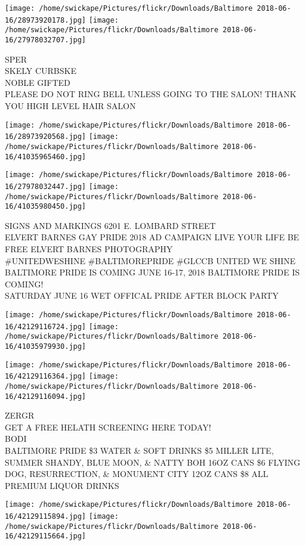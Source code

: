 \documentclass[10pt,letterpaper]{article}
\begin{document}
\texttt{[image: /home/swickape/Pictures/flickr/Downloads/Baltimore 2018-06-16/28973920178.jpg]}
\texttt{[image: /home/swickape/Pictures/flickr/Downloads/Baltimore 2018-06-16/27978032707.jpg]}

SPER\\
SKELY CURBSKE\\
NOBLE GIFTED\\
PLEASE DO NOT RING BELL UNLESS GOING TO THE SALON!  THANK YOU  HIGH LEVEL HAIR SALON
\pagebreak

\texttt{[image: /home/swickape/Pictures/flickr/Downloads/Baltimore 2018-06-16/28973920568.jpg]}
\texttt{[image: /home/swickape/Pictures/flickr/Downloads/Baltimore 2018-06-16/41035965460.jpg]}

\texttt{[image: /home/swickape/Pictures/flickr/Downloads/Baltimore 2018-06-16/27978032447.jpg]}
\texttt{[image: /home/swickape/Pictures/flickr/Downloads/Baltimore 2018-06-16/41035980450.jpg]}

SIGNS AND MARKINGS 6201 E. LOMBARD STREET\\
ELVERT BARNES GAY PRIDE 2018 AD CAMPAIGN LIVE YOUR LIFE BE FREE ELVERT BARNES PHOTOGRAPHY\\
\#UNITEDWESHINE \#BALTIMOREPRIDE \#GLCCB UNITED WE SHINE BALTIMORE PRIDE IS COMING JUNE 16{-}17, 2018 BALTIMORE PRIDE IS COMING!\\
SATURDAY JUNE 16 WET OFFICAL PRIDE AFTER BLOCK PARTY
\pagebreak

\texttt{[image: /home/swickape/Pictures/flickr/Downloads/Baltimore 2018-06-16/42129116724.jpg]}
\texttt{[image: /home/swickape/Pictures/flickr/Downloads/Baltimore 2018-06-16/41035979930.jpg]}

\texttt{[image: /home/swickape/Pictures/flickr/Downloads/Baltimore 2018-06-16/42129116364.jpg]}
\texttt{[image: /home/swickape/Pictures/flickr/Downloads/Baltimore 2018-06-16/42129116094.jpg]}

ZERGR\\
GET A FREE HELATH SCREENING HERE TODAY!\\
BODI\\
BALTIMORE PRIDE \$3 WATER \& SOFT DRINKS \$5 MILLER LITE, SUMMER SHANDY, BLUE MOON, \& NATTY BOH 16OZ CANS \$6 FLYING DOG, RESURRECTION, \& MONUMENT CITY 12OZ CANS \$8 ALL PREMIUM LIQUOR DRINKS
\pagebreak

\texttt{[image: /home/swickape/Pictures/flickr/Downloads/Baltimore 2018-06-16/42129115894.jpg]}
\texttt{[image: /home/swickape/Pictures/flickr/Downloads/Baltimore 2018-06-16/42129115664.jpg]}
\end{document}
